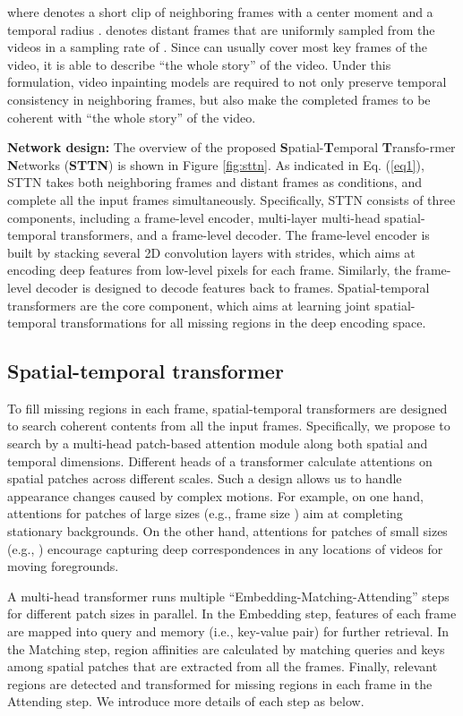 \documentclass[runningheads]{llncs}
\begin{document}
where  denotes a short clip of neighboring frames with a center moment  and a temporal radius .  denotes distant frames that are uniformly sampled from the videos  in a sampling rate of . 
Since  can usually cover most key frames of the video, it is able to describe ``the whole story'' of the video. Under this formulation, video inpainting models are required to not only preserve temporal consistency in neighboring frames, but also make the completed frames to be coherent with ``the whole story'' of the video.  


\textbf{Network design:}
The overview of the proposed \textbf{S}patial-\textbf{T}emporal \textbf{T}ransfo-rmer \textbf{N}etworks (\textbf{STTN}) is shown in Figure \ref{fig:sttn}. 
As indicated in Eq. (\ref{eq1}), STTN takes both neighboring frames  and distant frames  as conditions, and complete all the input frames simultaneously.
Specifically, STTN consists of three components, including a frame-level encoder, multi-layer multi-head spatial-temporal transformers, and a frame-level decoder. The frame-level encoder is built by stacking several 2D convolution layers with strides, which aims at encoding deep features from low-level pixels for each frame. Similarly, the frame-level decoder is designed to decode features back to frames. 
Spatial-temporal transformers are the core component, which aims at learning joint spatial-temporal transformations for all missing regions in the deep encoding space. 


\subsection{Spatial-temporal transformer}
\label{sec:sttn}

To fill missing regions in each frame, spatial-temporal transformers are designed to search coherent contents from all the input frames. 
Specifically, we propose to search by a multi-head patch-based attention module along both spatial and temporal dimensions.
Different heads of a transformer calculate attentions on spatial patches across different scales. Such a design allows us to handle appearance changes caused by complex motions.
For example, on one hand, attentions for patches of large sizes (e.g., frame size ) aim at completing stationary backgrounds. On the other hand, attentions for patches of small sizes (e.g., ) encourage capturing deep correspondences in any locations of videos for moving foregrounds.


A multi-head transformer runs multiple ``Embedding-Matching-Attending'' steps for different patch sizes in parallel. In the Embedding step, features of each frame are mapped into query and memory (i.e., key-value pair) for further retrieval. In the Matching step, region affinities are calculated by matching queries and keys among spatial patches that are extracted from all the frames. Finally, relevant regions are detected and transformed for missing regions in each frame in the Attending step. We introduce more details of each step as below. 
\end{document}
